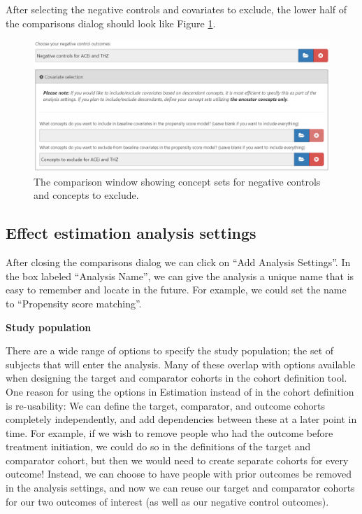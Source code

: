 \documentclass[11pt]{book}
\theoremstyle{definition}
\theoremstyle{definition}
\theoremstyle{definition}
\theoremstyle{remark}
\begin{document}
After selecting the negative controls and covariates to exclude, the lower half of the comparisons dialog should look like Figure \ref{fig:comparisons2}.

\begin{figure}

{\centering \includegraphics[width=1\linewidth]{images/PopulationLevelEstimation/comparisons2} 

}

\caption{The comparison window showing concept sets for negative controls and concepts to exclude.}\label{fig:comparisons2}
\end{figure}

\hypertarget{effect-estimation-analysis-settings}{%
\subsection{Effect estimation analysis settings}\label{effect-estimation-analysis-settings}}

After closing the comparisons dialog we can click on ``Add Analysis Settings''. In the box labeled ``Analysis Name'', we can give the analysis a unique name that is easy to remember and locate in the future. For example, we could set the name to ``Propensity score matching''.

\textbf{Study population}

There are a wide range of options to specify the study population; the set of subjects that will enter the analysis. Many of these overlap with options available when designing the target and comparator cohorts in the cohort definition tool. One reason for using the options in Estimation instead of in the cohort definition is re-usability: We can define the target, comparator, and outcome cohorts completely independently, and add dependencies between these at a later point in time. For example, if we wish to remove people who had the outcome before treatment initiation, we could do so in the definitions of the target and comparator cohort, but then we would need to create separate cohorts for every outcome! Instead, we can choose to have people with prior outcomes be removed in the analysis settings, and now we can reuse our target and comparator cohorts for our two outcomes of interest (as well as our negative control outcomes).
\end{document}
